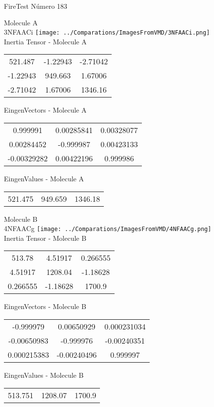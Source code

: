 \vtab[-2cm]
\begin{center}
{\large FireTest \tab Número 183}
\end{center}
\begin{multicols}{2}
\begin{center}

Molecule A \\ 
3NFAACi
\texttt{[image: ../Comparations/ImagesFromVMD/3NFAACi.png]}
\\
Inertia Tensor - Molecule A \\
\vtab

\begin{tabular}{|c c c|}
521.487	 & 	-1.22943	 & 	-2.71042	 \\
-1.22943	 & 	949.663	 & 	1.67006	 \\
-2.71042	 & 	1.67006	 & 	1346.16
\end{tabular}

\vtab
 EingenVectors - Molecule A     \\
\vtab
\begin{tabular}{|c c c|}
0.999991	 & 	0.00285841	 & 	0.00328077	 \\
0.00284452	 & 	-0.999987	 & 	0.00423133	 \\
-0.00329282	 & 	0.00422196	 & 	0.999986
\end{tabular}

\vtab
 EingenValues - Molecule A     \\
\vtab
\begin{tabular}{|c c c|}
521.475	 & 	949.659	 & 	1346.18	 \\
\end{tabular}
\columnbreak

Molecule B \\ 
4NFAACg
\texttt{[image: ../Comparations/ImagesFromVMD/4NFAACg.png]}
\\
Inertia Tensor - Molecule B \\
\vtab

\begin{tabular}{|c c c|}
513.78	 & 	4.51917	 & 	0.266555	 \\
4.51917	 & 	1208.04	 & 	-1.18628	 \\
0.266555	 & 	-1.18628	 & 	1700.9
\end{tabular}

\vtab
 EingenVectors - Molecule B     \\
\vtab
\begin{tabular}{|c c c|}
-0.999979	 & 	0.00650929	 & 	0.000231034	 \\
-0.00650983	 & 	-0.999976	 & 	-0.00240351	 \\
0.000215383	 & 	-0.00240496	 & 	0.999997
\end{tabular}

\vtab
 EingenValues - Molecule B     \\
\vtab
\begin{tabular}{|c c c|}
513.751	 & 	1208.07	 & 	1700.9	 \\
\end{tabular}

\end{center}
\end{multicols}
